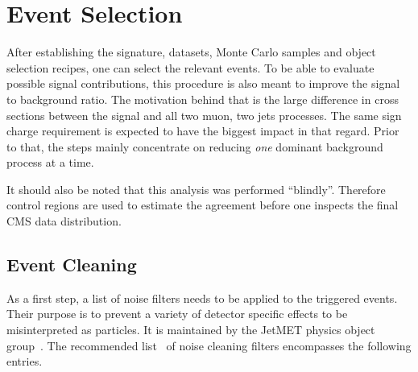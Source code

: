 \chapter{Event Selection}
\label{cha:eventsel}

After establishing the signature, datasets, Monte Carlo samples and object selection recipes, one can select the relevant events. To be able to evaluate possible signal contributions, this procedure is also meant to improve the signal to background ratio. The motivation behind that is the large difference in cross sections between the signal and all two muon, two jets processes. The same sign charge requirement is expected to have the biggest impact in that regard. Prior to that, the steps mainly concentrate on reducing \textit{one} dominant background process at a time.

It should also be noted that this analysis was performed ``blindly''. Therefore control regions are used to estimate the agreement before one inspects the final CMS data distribution.

\section{Event Cleaning}
\label{sec:evclean}

As a first step, a list of noise filters needs to be applied to the triggered events. Their purpose is to prevent a variety of detector specific effects to be misinterpreted as particles. It is maintained by the JetMET physics object group~\cite{jmepog}. The recommended list~\cite{jmefilters} of noise cleaning filters encompasses the following entries.

